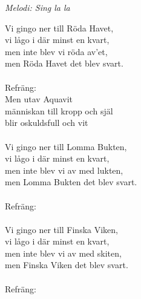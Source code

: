 {\footnotesize\textit{Melodi: Sing la la}}\par
\vspace{10pt}
Vi gingo ner till Röda Havet,\\
vi lågo i där minst en kvart,\\
men inte blev vi röda av’et,\\
men Röda Havet det blev svart.\\
\\
Refräng:\\
\revrpt Men utav Aquavit\\
människan till kropp och själ\\
blir oskuldsfull och vit\rpt\\
\\
Vi gingo ner till Lomma Bukten,\\
vi lågo i där minst en kvart,\\
men inte blev vi av med lukten,\\
men Lomma Bukten det blev svart.\\
\\
Refräng:\\
\\
Vi gingo ner till Finska Viken,\\
vi lågo i där minst en kvart,\\
men inte blev vi av med skiten,\\
men Finska Viken det blev svart.\\
\\
Refräng:
